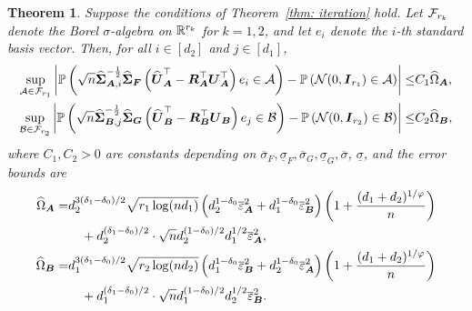 \documentclass[11pt,letterpaper]{article}
\def\calA{{\cal  A}} \def\cA{{\cal  A}}
\def\calB{{\cal  B}} \def\cB{{\cal  B}}
\def\calF{{\cal  F}} \def\cF{{\cal  F}}
\newtheorem{theorem}{Theorem}[section]
\theoremstyle{definition}
\begin{document}
\begin{theorem}\label{cor: data driven normality}
Suppose the conditions of Theorem~\ref{thm: iteration} hold. Let $\calF_{r_k}$ denote the Borel $\sigma$-algebra on $\mathbb{R}^{r_k}$ for $k=1,2$, and let $e_i$ denote the $i$-th standard basis vector. Then, for all $i \in [d_2]$ and $j \in [d_1]$,
\begin{align*}
\sup_{\calA \in \calF_{r_1}}\left|\PP\left(\sqrt{n} \widehat{\bSigma}_{\bA,i}^{-\frac{1}{2}}\widehat{\bSigma}_{\bF}\left(\widehat{\bU}_{\bA}^{\top}- \bR_{\bA}^{\top}\bU_{\bA}^{\top}\right)e_i \in \calA\right) - \PP\left(\mathcal{N}(0, \bI_{r_1}) \in \calA \right)\right| \le & C_1 \widehat{\Omega}_{\bA}, \\
\sup_{\calB \in \calF_{r_2}}\left|\PP\left(\sqrt{n} \widehat{\bSigma}_{\bB,j}^{-\frac{1}{2}}\widehat{\bSigma}_{\bG}\left(\widehat{\bU}_{\bB}^{\top} -\bR_{\bB}^{\top}\bU_{\bB}\right)e_j \in \calB\right) - \PP\left(\mathcal{N}(0, \bI_{r_2}) \in \calB\right)\right| \le & C_2 \widehat{\Omega}_{\bB},
\end{align*}
where $C_1,C_2>0$ are constants depending on $\overline{\sigma}_{F}, \underline{\sigma}_{ F}, \overline{\sigma}_{G}, \underline{\sigma}_{G}, \overline{\sigma}$, $\underline{\sigma}$, and the error bounds are
\begin{align*}
\widehat{\Omega}_{\boldsymbol{A}}
= & d_2^{3(\delta_1-\delta_0)/2} \sqrt{r_1\log(nd_1)}\left( d_2^{1-\delta_0} \overline{\varepsilon}_{\boldsymbol{A}}^2 + d_1^{1-\delta_0} \overline{\varepsilon}_{\boldsymbol{B}}^2 \right)  \left(1 + \frac{(d_1+d_2)^{1/\varphi}}{n}\right) \\
&\quad + d_2^{(\delta_1-\delta_0)/2} \cdot \sqrt{n} d_2^{(1-\delta_0)/2}d_1^{1/2} \overline{\varepsilon}_{\boldsymbol{A}}^2 , \\
\widehat{\Omega}_{\boldsymbol{B}}
= & d_1^{3(\delta_1-\delta_0)/2} \sqrt{r_2\log(nd_2)} \left( d_1^{1-\delta_0} \overline{\varepsilon}_{\boldsymbol{B}}^2 + d_2^{1-\delta_0} \overline{\varepsilon}_{\boldsymbol{A}}^2 \right)  \left(1 + \frac{(d_1+d_2)^{1/\varphi}}{n}\right) \\
&\quad + d_1^{(\delta_1-\delta_0)/2} \cdot \sqrt{n} d_1^{(1-\delta_0)/2}d_2^{1/2} \overline{\varepsilon}_{\boldsymbol{B}}^2.
\end{align*}
\end{theorem}
\end{document}
